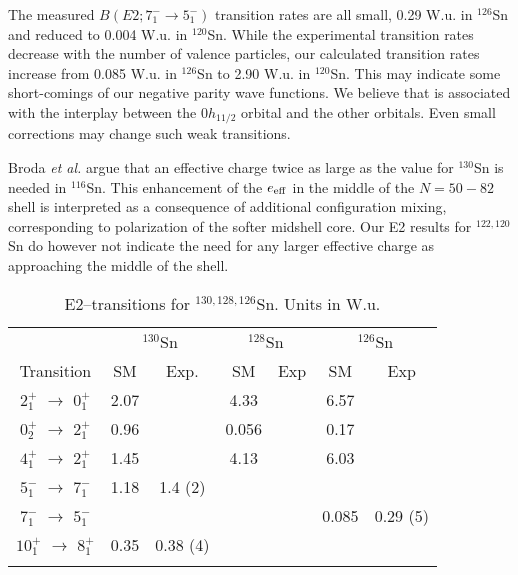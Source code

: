 The measured $B(E2;7^-_1 \rightarrow 5^-_1)$ transition rates are all small,
0.29 W.u. in $^{126}$Sn and reduced to 0.004 W.u. in $^{120}$Sn. While the 
experimental transition rates decrease with the number of valence particles,
our calculated transition rates increase from 0.085 W.u. in $^{126}$Sn to
2.90 W.u. in $^{120}$Sn. This may indicate some short-comings of our negative
parity wave functions. We believe that is associated with the interplay 
between the $0h_{11/2}$ orbital and the other orbitals. Even small 
corrections may change such weak transitions.

Broda {\em et al.} \cite{brod92} argue that an effective charge twice as 
large as the value for $^{130}$Sn is needed in $^{116}$Sn. This enhancement
of the $e_{\rm eff}$ in the middle of the $N = 50-82$ shell is interpreted 
as a consequence of additional configuration mixing, corresponding to 
polarization of the softer midshell core. Our E2 results for 
$^{122,120}$Sn do however not indicate the need for any larger effective 
charge as approaching the middle of the shell.
 

\begin{table}[htbp]
\begin{center}
\begin{tabular}{ccccccc}
\hline
 & \multicolumn{2}{c}{ $^{130}$Sn} &  \multicolumn{2}{c}{ $^{128}$Sn} &
\multicolumn{2}{c}{ $^{126}$Sn} \\

Transition& SM & Exp. & SM & Exp & SM & Exp \\ \hline
$2_{1}^{+}$ $\rightarrow$ $0_{1}^{+}$  & 2.07 &          & 4.33 & & 6.57 & \\ 
$0_{2}^{+}$ $\rightarrow$ $2_{1}^{+}$  & 0.96 &          & 0.056 & & 0.17 & \\
$4_{1}^{+}$ $\rightarrow$ $2_{1}^{+}$  & 1.45 &          & 4.13 & & 6.03 & \\  
$5_{1}^{-}$ $\rightarrow$ $7_{1}^{-}$  & 1.18 & 1.4 (2)  & & & &          \\
$7_{1}^{-}$ $\rightarrow$ $5_{1}^{-}$  &      &          & & & 0.085 & 0.29 (5) \\
$10_{1}^{+}$ $\rightarrow$ $8_{1}^{+}$ & 0.35 & 0.38 (4) & & & &          \\
&&&&&&\\
\hline
\end{tabular}
\caption{E2--transitions for $^{130,128,126}$Sn. Units in W.u.}
\label{tab:rateof}
\end{center}
\end{table}


